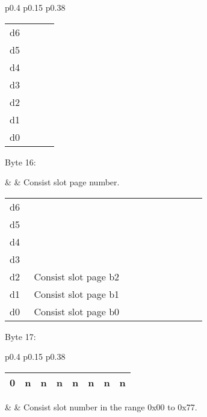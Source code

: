 \begin{tabular}{p{0.4\linewidth} p{0.15\linewidth} p{0.38\linewidth}} 

\begin{tabular}{|p{0.3cm}|p{0.3cm}|p{0.3cm}|p{0.3cm}|p{0.3cm}|p{0.3cm}|p{0.3cm}|p{0.3cm}|}
\hline
0 & d6 & d5 & d4 & d3 & d2 & d1 & d0\\
\hline
\end{tabular}
&  & Unknown.\\
\end{tabular}

\begin{tabular}{p{0.05\linewidth} p{0.6\linewidth}} 
d6 & \\
d5 & \\
d4 & \\
d3 & \\
d2 & \\
d1 & \\
d0 & \\
\end{tabular}

Byte 16:

&  & Consist slot page number.\\
\end{tabular}

\begin{tabular}{p{0.05\linewidth} p{0.6\linewidth}} 
d6 & \\
d5 & \\
d4 & \\
d3 & \\
d2 & Consist slot page b2\\
d1 & Consist slot page b1\\
d0 & Consist slot page b0\\
\end{tabular}

Byte 17:

\begin{tabular}{p{0.4\linewidth} p{0.15\linewidth} p{0.38\linewidth}} 

\begin{tabular}{|p{0.3cm}|p{0.3cm}|p{0.3cm}|p{0.3cm}|p{0.3cm}|p{0.3cm}|p{0.3cm}|p{0.3cm}|}
\hline
0 & n & n & n & n & n & n & n\\
\hline
\end{tabular}
&  & Consist slot number in the range 0x00 to 0x77.\\
\end{tabular}

